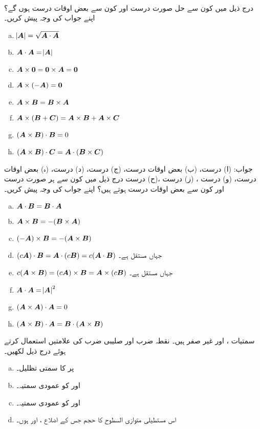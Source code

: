 \\
درج ذیل میں کون سے حل صورت درست اور کون سے بعض اوقات درست ہوں گے؟ اپنے جواب کی وجہ پیش کریں۔
\begin{enumerate}[a.]
\item
$\abs{\kvec{A}}=\sqrt{\kvec{A}\cdot\kvec{A}}$
\item
$\kvec{A}\cdot\kvec{A}=\abs{\kvec{A}}$
\item
$\kvec{A}\times \kvec{0}=\kvec{0}\times\kvec{A}=\kvec{0}$
\item
$\kvec{A}\times (-\kvec{A})=\kvec{0}$
\item
$\kvec{A}\times\kvec{B}=\kvec{B}\times\kvec{A}$
\item
$\kvec{A}\times(\kvec{B}+\kvec{C})=\kvec{A}\times\kvec{B}+\kvec{A}\times\kvec{C}$
\item
$(\kvec{A}\times\kvec{B})\cdot\kvec{B}=0$
\item
$(\kvec{A}\times\kvec{B})\cdot\kvec{C}=\kvec{A}\cdot(\kvec{B}\times\kvec{C})$
\end{enumerate}
جواب:\quad
(ا) درست، (ب) بعض اوقات درست، (ج) درست، (د) درست، (ہ) بعض اوقات درست، (و) درست ، (ز) درست  ،(ح) درست
درج ذیل میں کون سے ہر صورت درست اور کون سے بعض اوقات درست ہوتے ہیں؟ اپنے جواب کی وجہ پیش کریں۔
\begin{enumerate}[a.]
\item
$\kvec{A}\cdot\kvec{B}=\kvec{B}\cdot\kvec{A}$
\item
$\kvec{A}\times\kvec{B}=-(\kvec{B}\times\kvec{A})$
\item
$(-\kvec{A})\times\kvec{B}=-(\kvec{A}\times\kvec{B})$
\item
$(c\kvec{A})\cdot\kvec{B}=\kvec{A}\cdot(c\kvec{B})=c(\kvec{A}\cdot\kvec{B})$
\quad
جہاں  مستقل ہے۔
\item
$c(\kvec{A}\times\kvec{B})=(c\kvec{A})\times\kvec{B}=\kvec{A}\times(c\kvec{B})$
\quad
جہاں  مستقل ہے۔
\item
$\kvec{A}\cdot\kvec{A}=\abs{\kvec{A}}^2$
\item
$(\kvec{A}\times\kvec{A})\cdot\kvec{A}=0$
\item
$(\kvec{A}\times\kvec{B})\cdot\kvec{A}=\kvec{B}\cdot(\kvec{A}\times\kvec{B})$
\end{enumerate}
سمتیات ،  اور  غیر صفر ہیں۔ نقطہ ضرب اور صلیبی ضرب کی علامتیں استعمال کرتے ہوئے درج ذیل لکھیں۔
\begin{enumerate}[a.]
\item
{} پر  کا سمتی تظلیل۔
\item
{} اور  کو عمودی سمتیہ۔
\item
{} اور  کو عمودی سمتیہ۔
\item
اس مستطیلی متوازی السطوح کا حجم جس کے اضلاع ،  اور  ہوں۔
\end{enumerate}
